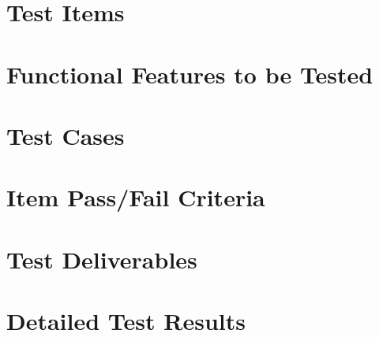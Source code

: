 \documentclass[a4paper,12pt]{article}
\begin{document}
	\section{Test Items}	
		
	
	
	
	\section{Functional Features to be Tested}	
		
	
	
	
	\section{Test Cases}	
		
	
	
	
	\section{Item Pass/Fail Criteria}	
	
	
	
	
	\section{Test Deliverables}	 
		

	
	
	
	\section{Detailed Test Results}	 
		
	
\end{document}
